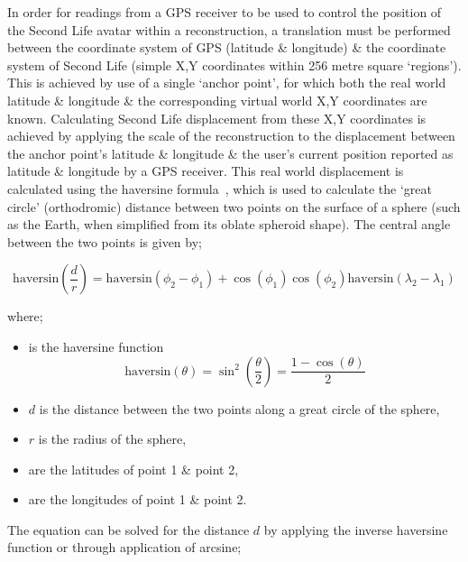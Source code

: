 In order for readings from a GPS receiver to be used to control the position of the Second Life avatar within a reconstruction, a translation must be performed between the coordinate system of GPS (latitude \& longitude) \& the coordinate system of Second Life (simple X,Y coordinates within 256 metre square `regions'). This is achieved by use of a single `anchor point', for which both the real world latitude \& longitude \& the corresponding virtual world X,Y coordinates are known. Calculating Second Life displacement from these X,Y coordinates is achieved by applying the scale of the reconstruction to the displacement between the anchor point's latitude \& longitude \& the user's current position reported as latitude \& longitude by a GPS receiver. This real world displacement is calculated using the haversine formula~\cite{Gellert1989}, which is used to calculate the `great circle' (orthodromic) distance between two points on the surface of a sphere (such as the Earth, when simplified from its oblate spheroid shape). The central angle  between the two points is given by;

\begin{equation}
\label{haversine1}
\text{haversin}\left(\frac{d}{r}\right) = \text{haversin}(\phi_{2}-\phi_{1})+\cos(\phi_{1})\cos(\phi_{2})\text{haversin}(\lambda_{2}-\lambda_{1})
\end{equation}

where;

\begin{itemize}
	\item {} is the haversine function
		\begin{equation}
		\label{harsine2}
			\text{haversin}(\theta) = \sin^{2}\left( \frac{\theta}{2}\right) = \frac{1-\cos(\theta)}{2}
		\end{equation}
	\item $d$ is the distance between the two points along a great circle of the sphere,
	\item $r$ is the radius of the sphere,
	\item {} are the latitudes of point 1 \& point 2,
	\item {} are the longitudes of point 1 \& point 2.
\end{itemize}

The equation can be solved for the distance $d$ by applying the inverse haversine function or through application of arcsine;

